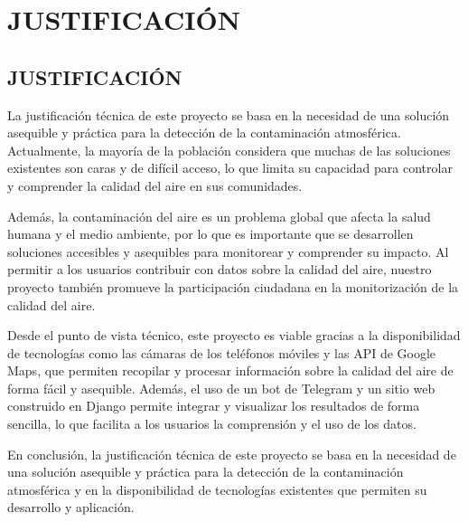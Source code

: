 \chapter{JUSTIFICACIÓN}\label{Int}
\thispagestyle{fancy}
\section{JUSTIFICACIÓN}\label{justificación}
La justificación técnica de este proyecto se basa en la necesidad de una solución asequible y práctica para la detección de la contaminación atmosférica. Actualmente, la mayoría de la población considera que muchas de las soluciones existentes son caras y de difícil acceso, lo que limita su capacidad para controlar y comprender la calidad del aire en sus comunidades.

Además, la contaminación del aire es un problema global que afecta la salud humana y el medio ambiente, por lo que es importante que se desarrollen soluciones accesibles y asequibles para monitorear y comprender su impacto. Al permitir a los usuarios contribuir con datos sobre la calidad del aire, nuestro proyecto también promueve la participación ciudadana en la monitorización de la calidad del aire.

Desde el punto de vista técnico, este proyecto es viable gracias a la disponibilidad de tecnologías como las cámaras de los teléfonos móviles y las API de Google Maps, que permiten recopilar y procesar información sobre la calidad del aire de forma fácil y asequible. Además, el uso de un bot de Telegram y un sitio web construido en Django permite integrar y visualizar los resultados de forma sencilla, lo que facilita a los usuarios la comprensión y el uso de los datos.

En conclusión, la justificación técnica de este proyecto se basa en la necesidad de una solución asequible y práctica para la detección de la contaminación atmosférica y en la disponibilidad de tecnologías existentes que permiten su desarrollo y aplicación.